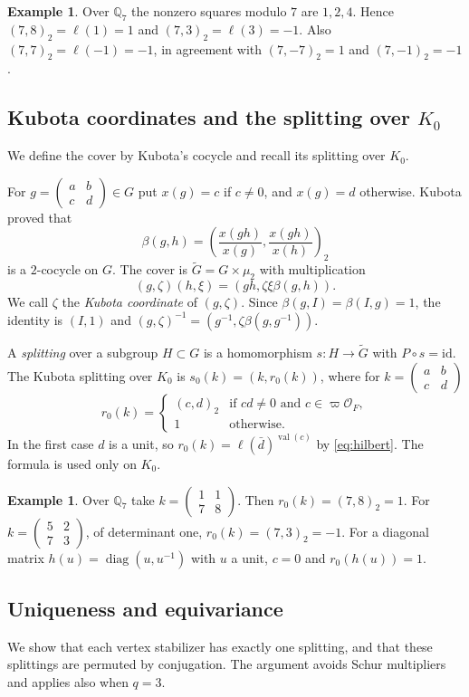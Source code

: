 \documentclass[12pt,letterpaper]{article}
\numberwithin{equation}{section}
\theoremstyle{definition}
\newtheorem{example}[theorem]{Example}
\theoremstyle{remark}
\newcommand{\OO}{\mathcal O_F}
\newcommand{\Mp}{\widetilde G}
\newcommand{\val}{\operatorname{val}}
\newcommand{\diag}{\operatorname{diag}}
\newcommand{\sm}[4]{\left(\begin{smallmatrix}#1&#2\\#3&#4\end{smallmatrix}\right)}
\begin{document}
\begin{example}
Over $\mathbb Q_7$ the nonzero squares modulo $7$ are $1,2,4$. Hence $(7,8)_2=\ell(1)=1$ and $(7,3)_2=\ell(3)=-1$. Also $(7,7)_2=\ell(-1)=-1$, in agreement with $(7,-7)_2=1$ and $(7,-1)_2=-1$.
\end{example}

\subsection{Kubota coordinates and the splitting over \texorpdfstring{$K_0$}{K0}}
We define the cover by Kubota's cocycle and recall its splitting over $K_0$.

For $g=\sm abcd\in G$ put $x(g)=c$ if $c\ne0$, and $x(g)=d$ otherwise. Kubota \cite{Ku67} proved that
\begin{equation}\label{eq:kubota}
 \beta(g,h)=\left(\frac{x(gh)}{x(g)},\frac{x(gh)}{x(h)}\right)_2
\end{equation}
is a $2$-cocycle on $G$. The cover is $\Mp=G\times\mu_2$ with multiplication
\[
 (g,\zeta)(h,\xi)=(gh,\zeta\xi\beta(g,h)) .
\]
We call $\zeta$ the \emph{Kubota coordinate} of $(g,\zeta)$. Since $\beta(g,I)=\beta(I,g)=1$, the identity is $(I,1)$ and $(g,\zeta)^{-1}=(g^{-1},\zeta\beta(g,g^{-1}))$.

A \emph{splitting} over a subgroup $H\subset G$ is a homomorphism $s:H\to\Mp$ with $P\circ s=\mathrm{id}$. The Kubota splitting over $K_0$ \cite{Ku67,Ge76} is $s_0(k)=(k,r_0(k))$, where for $k=\sm abcd$
\begin{equation}\label{eq:r0}
 r_0(k)=
 \begin{cases}
 (c,d)_2 & \text{if } cd\ne0 \text{ and } c\in\varpi\OO,\\
 1&\text{otherwise}.
 \end{cases}
\end{equation}
In the first case $d$ is a unit, so $r_0(k)=\ell(\bar d)^{\val(c)}$ by \eqref{eq:hilbert}. The formula is used only on $K_0$.

\begin{example}
Over $\mathbb Q_7$ take $k=\sm1178$. Then $r_0(k)=(7,8)_2=1$. For $k=\sm5273$, of determinant one, $r_0(k)=(7,3)_2=-1$. For a diagonal matrix $h(u)=\diag(u,u^{-1})$ with $u$ a unit, $c=0$ and $r_0(h(u))=1$.
\end{example}

\subsection{Uniqueness and equivariance}
We show that each vertex stabilizer has exactly one splitting, and that these splittings are permuted by conjugation. The argument avoids Schur multipliers and applies also when $q=3$.
\end{document}

